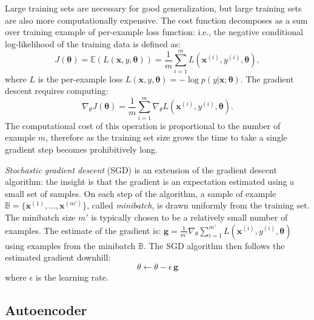 Large training sets are necessary for good generalization, but large training sets are also more computationally expensive.
The cost function decomposes as a sum over training example of per-example loss function:
i.e., the negative conditional log-likelihood of the training data is defined as:
\begin{equation}
J(\mathbf{\theta}) = \mathbb{E}(L(\textbf{x}, y, \mathbf{\theta})) = \frac{1}{m} \sum\limits_{i=1}^{m} L(\textbf{x}^{(i)}, y^{(i)}, \mathbf{\theta}),
\end{equation}
where $L$ is the per-example loss $L(\textbf{x}, y, \mathbf{\theta}) = - \log p(y|\textbf{x};\mathbf{\theta})$.
The gradient descent requires computing:
\begin{equation}
\nabla_{\theta} J(\mathbf{\theta}) = \frac{1}{m} \sum\limits_{i=1}^{m} \nabla_{\theta} L(\textbf{x}^{(i)}, y^{(i)}, \mathbf{\theta}).
\end{equation}
The computational cost of this operation is proportional to the number of example $m$, therefore as the training set size grows the time to take a single gradient step becomes prohibitively long.

\textit{Stochastic gradient descent} (SGD) is an extension of the gradient descent algorithm: the insight is that the gradient is an expectation estimated using a small set of samples.
On each step of the algorithm, a sample of example $\mathbb{B} = \{ \textbf{x}^{(1)}, \ldots, \textbf{x}^{(m')}\}$, called \textit{minibatch}, is drawn uniformly from the training set.
The minibatch size $m'$ is typically chosen to be a relatively small number of examples.
The estimate of the gradient is:
$\textbf{g} = \frac{1}{m'} \nabla_{\theta} \sum\limits_{i=1}^{m'} L(\textbf{x}^{(i)}, y^{(i)}, \mathbf{\theta})$
using examples from the minibatch $\mathbb{B}$.
The SGD algorithm then follows the estimated gradient downhill:
\begin{equation}
\theta \leftarrow \theta - \epsilon\,\textbf{g}
\end{equation}
where $\epsilon$ is the learning rate.






\subsection{Autoencoder}

